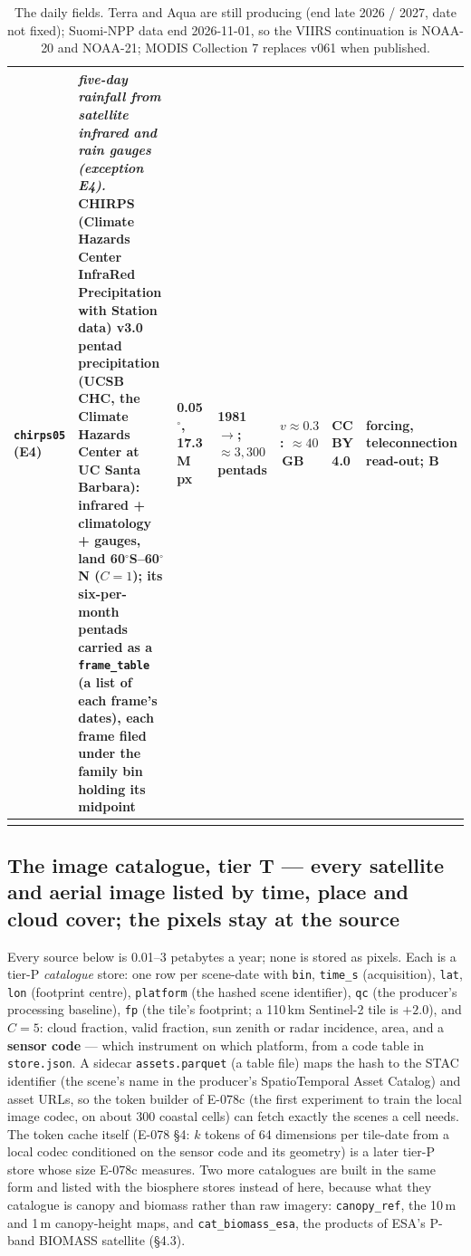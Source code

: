 \documentclass[10pt]{article}
\newcommand{\code}[1]{\texttt{#1}}
\begin{document}
{\begin{longtable}{@{}L{1.25cm}L{4.6cm}L{1.5cm}L{2.4cm}L{2.3cm}L{1.3cm}L{1.9cm}@{}}
\code{chirps05} (E4) & \emph{five-day rainfall from satellite infrared and rain gauges (exception E4).} CHIRPS (Climate Hazards Center InfraRed Precipitation with Station data) v3.0 pentad precipitation (UCSB CHC, the Climate Hazards Center at UC Santa Barbara): infrared + climatology + gauges, land 60$^\circ$S--60$^\circ$N ($C = 1$); its six-per-month pentads carried as a \code{frame\_table} (a list of each frame's dates), each frame filed under the family bin holding its midpoint & 0.05$^\circ$, 17.3\,M px & 1981 $\to$; $\approx 3{,}300$ pentads & $v \approx 0.3$: $\approx 40$\,GB & CC BY 4.0 & forcing, teleconnection read-out; B \\
\bottomrule
\caption{The daily fields. Terra and Aqua are still producing (end late 2026 /
2027, date not fixed); Suomi-NPP data end 2026-11-01, so the VIIRS
continuation is NOAA-20 and NOAA-21; MODIS Collection 7 replaces v061 when
published.}
\end{longtable}}

\subsection{The image catalogue, tier T --- every satellite and aerial image listed by time, place and cloud cover; the pixels stay at the source}

Every source below is 0.01--3 petabytes a year; none is stored as pixels.
Each is a tier-P \emph{catalogue} store: one row per scene-date with
\code{bin}, \code{time\_s} (acquisition), \code{lat}, \code{lon} (footprint
centre), \code{platform} (the hashed scene identifier), \code{qc} (the
producer's processing baseline), \code{fp} (the tile's footprint; a 110\,km
Sentinel-2 tile is $+2.0$), and $C = 5$: cloud fraction, valid fraction, sun
zenith or radar incidence, area, and a \textbf{sensor code} --- which
instrument on which platform, from a code table in \code{store.json}. A
sidecar \code{assets.parquet} (a table file) maps the hash to the STAC identifier (the scene's name in the producer's SpatioTemporal Asset Catalog) and
asset URLs, so the token builder of E-078c (the first experiment to train the local image codec, on about 300 coastal cells) can fetch exactly the scenes a
cell needs. The token cache itself (E-078 \S4: $k$ tokens of 64 dimensions
per tile-date from a local codec conditioned on the sensor code and its
geometry) is a later tier-P store whose size E-078c measures. Two more
catalogues are built in the same form and listed with the biosphere stores
instead of here, because what they catalogue is canopy and biomass rather
than raw imagery: \code{canopy\_ref}, the 10\,m and 1\,m canopy-height maps,
and \code{cat\_biomass\_esa}, the products of ESA's P-band BIOMASS satellite
(\S4.3).
\end{document}
